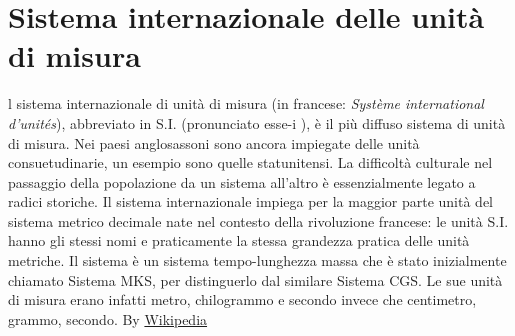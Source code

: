 \section{Sistema internazionale delle unità di misura}
l sistema internazionale di unità di misura (in francese: \textit{Système international d'unités}), abbreviato in S.I. (pronunciato esse-i
), è il più diffuso sistema di unità di misura. Nei paesi anglosassoni sono ancora impiegate delle unità consuetudinarie, un esempio sono quelle statunitensi.
La difficoltà culturale nel passaggio della popolazione da un sistema all'altro è essenzialmente legato a radici storiche. Il sistema internazionale impiega per la maggior parte unità del sistema metrico decimale nate nel contesto della rivoluzione francese: le unità S.I. hanno gli stessi nomi e praticamente la stessa grandezza pratica delle unità metriche. Il sistema è un sistema tempo-lunghezza massa che è stato inizialmente chiamato Sistema MKS, per distinguerlo dal similare Sistema CGS. Le sue unità di misura erano infatti metro, chilogrammo e secondo invece che centimetro, grammo, secondo. By \href{https://it.wikipedia.org/wiki/Sistema_internazionale_di_unità_di_misura}{Wikipedia}
